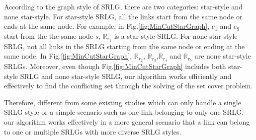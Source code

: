 According to the graph style of SRLG, there are two categories:  star-style and none star-style. For star-style SRLG, all the links start from the same node or ends at the same node. For example, in Fig.\ref{fig:MinCutStarGraph}, $e_1$ and $e_9$ start from the  the same node $s$, $\mathbb{R}_{r_1}$ is a star-style SRLG.  For none star-style SRLG, not all links in the SRLG starting from the same node or ending at the same node. In Fig.\ref{fig:MinCutStarGraph}, $\mathbb{R}_{r_2}$, $\mathbb{R}_{r_3}$,$\mathbb{R}_{r_4}$ and $\mathbb{R}_{r_5}$ are none star-style SRLGs.
Moreover, even though Fig.\ref{fig:MinCutStarGraph} includes both  star-style SRLG  and none star-style SRLG,  our  algorithm works efficiently and effectively to find the conflicting set through the solving of the set cover problem.

Therefore, different from some existing studies which can only handle a single SRLG style or a simple scenario such as  one link belonging to only one SRLG, our algorithm works effectively in a more  general scenario that a link can belong to one or multiple SRLGs with more diverse SRLG styles.




